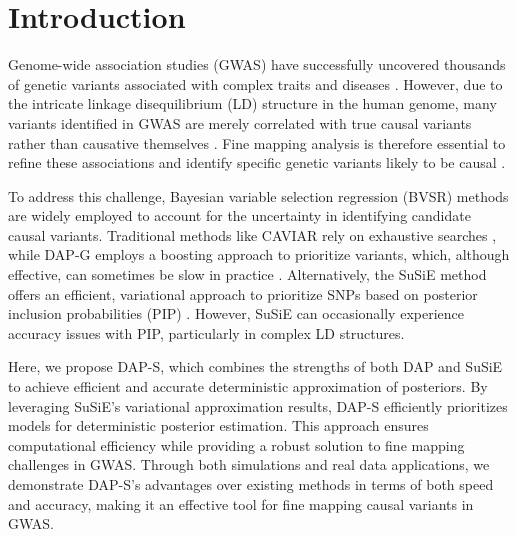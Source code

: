 \documentclass[pdflatex,sn-mathphys-num]{sn-jnl}%
\theoremstyle{thmstyleone}%
\theoremstyle{thmstyletwo}%
\theoremstyle{thmstylethree}%
\begin{document}

\maketitle



\section{Introduction}\label{sec1}
Genome-wide association studies (GWAS) have successfully uncovered thousands of genetic variants associated with complex traits and diseases \cite{visscher201710}. However, due to the intricate linkage disequilibrium (LD) structure in the human genome, many variants identified in GWAS are merely correlated with true causal variants rather than causative themselves \cite{ardlie2002patterns}. Fine mapping analysis is therefore essential to refine these associations and identify specific genetic variants likely to be causal \cite{spain2015strategies, schaid2018genome}.

To address this challenge, Bayesian variable selection regression (BVSR) methods are widely employed to account for the uncertainty in identifying candidate causal variants. Traditional methods like CAVIAR rely on exhaustive searches \cite{hormozdiari2014identifying}, while DAP-G employs a boosting approach to prioritize variants, which, although effective, can sometimes be slow in practice \cite{wen2016efficient, lee2018bayesian}. Alternatively, the SuSiE method offers an efficient, variational approach to prioritize SNPs based on posterior inclusion probabilities (PIP) \cite{wang2020simple}. However, SuSiE can occasionally experience accuracy issues with PIP, particularly in complex LD structures.

Here, we propose DAP-S, which combines the strengths of both DAP and SuSiE to achieve efficient and accurate deterministic approximation of posteriors. By leveraging SuSiE's variational approximation results, DAP-S efficiently prioritizes models for deterministic posterior estimation. This approach ensures computational efficiency while providing a robust solution to fine mapping challenges in GWAS. Through both simulations and real data applications, we demonstrate DAP-S’s advantages over existing methods in terms of both speed and accuracy, making it an effective tool for fine mapping causal variants in GWAS.
\end{document}
